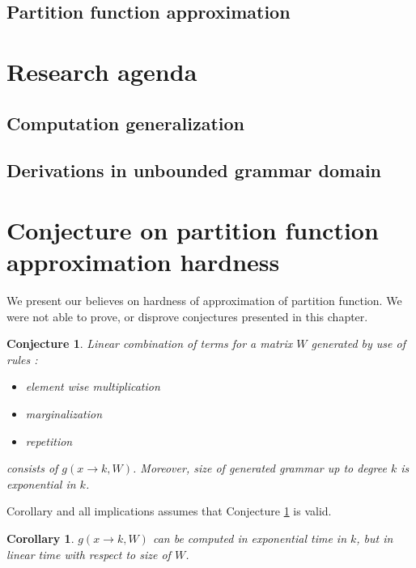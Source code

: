 \documentclass{article}
\newtheorem{conjecture}[theorem]{Conjecture}
\newtheorem{corollary}[theorem]{Corollary}
\begin{document}
\subsection{Partition function approximation}

\section{Research agenda}

\subsection{Computation generalization}

\subsection{Derivations in unbounded grammar domain}

\section{Conjecture on partition function approximation hardness}

We present our believes on hardness of approximation of partition function. 
We were not able to prove, or disprove conjectures presented in this chapter.

\begin{conjecture}
Linear combination of terms for a matrix $W$ generated by use of rules :
\begin{itemize}
	\item element wise multiplication
	\item marginalization
	\item repetition
\end{itemize}
consists of $g(x \rightarrow k, W)$. Moreover, size of generated grammar
up to degree $k$ is exponential in $k$.
\label{simple}
\end{conjecture}

Corollary and all implications assumes that Conjecture \ref{simple} is valid.

\begin{corollary}
	$g(x \rightarrow k, W)$
	can be computed in exponential time in $k$, but in linear time with respect to size of $W$.
\end{corollary}
\end{document}

